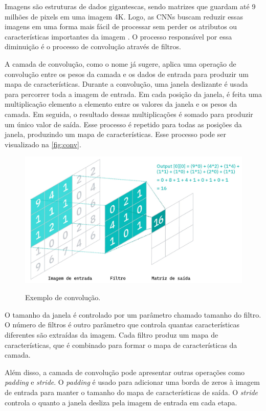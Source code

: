 Imagens são estruturas de dados gigantescas, sendo matrizes que guardam até 9 milhões de pixels em uma imagem 4K. 
Logo, as CNNs buscam reduzir essas imagens em uma forma mais fácil de processar sem perder os atributos ou características importantes da imagem \cite{sumitCNN}. 
O processo responsável por essa diminuição é o processo de convolução através de filtros.

A camada de convolução, como o nome já sugere, aplica uma operação de convolução entre os pesos da camada e os dados de entrada para produzir um mapa de características.
Durante a convolução, uma janela deslizante é usada para percorrer toda a imagem de entrada. 
Em cada posição da janela, é feita uma multiplicação elemento a elemento entre os valores da janela e os pesos da camada. 
Em seguida, o resultado dessas multiplicações é somado para produzir um único valor de saída. 
Esse processo é repetido para todas as posições da janela, produzindo um mapa de características.
Esse processo pode ser visualizado na \autoref{fig:conv}.

\begin{figure}[htb]
    \centering
    \caption{Exemplo de convolução.}
    \includegraphics[width=0.8\linewidth]{TCC UFG/images/conv.jpg}
    \label{fig:conv}
\end{figure}

O tamanho da janela é controlado por um parâmetro chamado tamanho do filtro. 
O número de filtros é outro parâmetro que controla quantas características diferentes são extraídas da imagem. 
Cada filtro produz um mapa de características, que é combinado para formar o mapa de características da camada.

Além disso, a camada de convolução pode apresentar outras operações como \textit{padding} e \textit{stride}. 
O \textit{padding} é usado para adicionar uma borda de zeros à imagem de entrada para manter o tamanho do mapa de características de saída. 
O \textit{stride} controla o quanto a janela desliza pela imagem de entrada em cada etapa.


